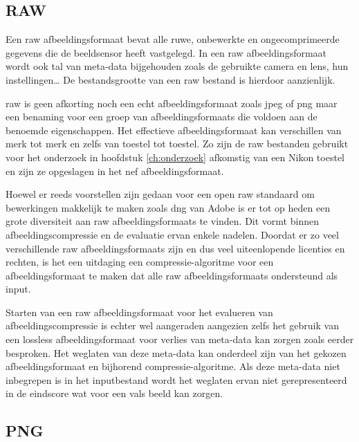 \subsection{RAW}
\label{sec:afbeeldingscompressie-raw}

Een \gls{raw} \gls{afbeeldingsformaat} bevat alle ruwe, onbewerkte en ongecomprimeerde gegevens die de beeldsensor heeft vastgelegd. In een \gls{raw} \gls{afbeeldingsformaat} wordt ook tal van \gls{meta-data}  bijgehouden zoals de gebruikte camera en lens, hun instellingen… De bestandsgrootte van een \gls{raw} bestand is hierdoor aanzienlijk. 

\Gls{raw} is geen afkorting noch een echt \gls{afbeeldingsformaat} zoals \gls{jpeg} of \gls{png} maar een benaming voor een groep van \glspl{afbeeldingsformaat} die voldoen aan de benoemde eigenschappen. Het effectieve \gls{afbeeldingsformaat} kan verschillen van merk tot merk en zelfs van toestel tot toestel. Zo zijn de \gls{raw} bestanden gebruikt voor het onderzoek in hoofdstuk \ref{ch:onderzoek} afkomstig van een Nikon toestel en zijn ze opgeslagen in het \gls{nef} \gls{afbeeldingsformaat}.

Hoewel er reeds voorstellen zijn gedaan voor een open \gls{raw} standaard om bewerkingen makkelijk te maken zoals \gls{dng} van Adobe is er tot op heden een grote diversiteit aan \gls{raw} \glspl{afbeeldingsformaat} te vinden. Dit vormt binnen \gls{afbeeldingscompressie} en de evaluatie ervan enkele nadelen. Doordat er zo veel verschillende \gls{raw} \glspl{afbeeldingsformaat} zijn en dus veel uiteenlopende licenties en rechten, is het een uitdaging een \gls{compressie-algoritme} voor een \gls{afbeeldingsformaat} te maken dat alle \gls{raw} \glspl{afbeeldingsformaat} ondersteund als input. 

Starten van een \gls{raw} \gls{afbeeldingsformaat} voor het evalueren van \gls{afbeeldingscompressie} is echter wel aangeraden aangezien zelfs het gebruik van een \gls{lossless} \gls{afbeeldingsformaat} voor verlies van \gls{meta-data} kan zorgen zoals eerder besproken. Het weglaten van deze \gls{meta-data} kan onderdeel zijn van het gekozen \gls{afbeeldingsformaat} en bijhorend \gls{compressie-algoritme}. Als deze \gls{meta-data} niet inbegrepen is in het inputbestand wordt het weglaten ervan niet gerepresenteerd in de eindscore wat voor een vals beeld kan zorgen.

\subsection{PNG}
\label{sec:afbeeldingscompressie-png}

